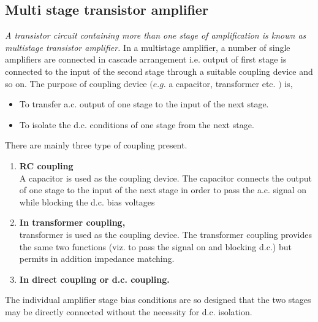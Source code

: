 \subsection{Multi stage transistor amplifier}
\textit{A transistor circuit containing more than one stage of amplification is known as multistage transistor amplifier.}
In a multistage amplifier, a number of single amplifiers are connected in cascade arrangement i.e. output of first stage is connected to the input of the second stage through a suitable coupling device and so on. The purpose of coupling device $(e . g .$ a capacitor, transformer etc. $)$ is,
\begin{itemize}
	\item   To transfer a.c. output of one stage to the input of the next stage.
	\item   To isolate the d.c. conditions of one stage from the next stage.
\end{itemize}
There are mainly three type of coupling present.
\begin{enumerate}
	\item \textbf{RC coupling}\\
	A capacitor is used as the coupling device. The capacitor connects the output of one stage to the input of the next stage in order to pass the a.c. signal on while blocking the d.c. bias voltages
	\item  \textbf{In transformer coupling,} \\
	transformer is used as the coupling device. The transformer coupling provides the same two functions (viz. to pass the signal on and blocking d.c.) but permits in addition impedance matching.
	\item \textbf{In direct coupling or d.c. coupling.}
	
\end{enumerate}
The individual amplifier stage bias conditions are so designed that the two stages may be directly connected without the necessity for d.c. isolation.

 
